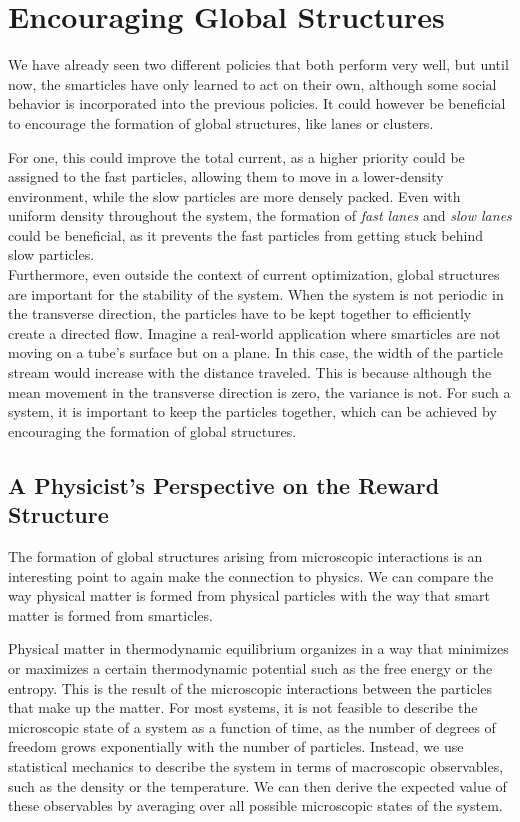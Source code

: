 \section{Encouraging Global Structures}
\label{sec:global_structures}
We have already seen two different policies that both perform very well, but until now, the smarticles have only learned to act on their own, although some social behavior is incorporated into the previous policies. It could however be beneficial to encourage the formation of global structures, like lanes or clusters. 


For one, this could improve the total current, as a higher priority could be assigned to the fast particles, allowing them to move in a lower-density environment, while the slow particles are more densely packed. Even with uniform density throughout the system, the formation of \textit{fast lanes} and \textit{slow lanes} could be beneficial, as it prevents the fast particles from getting stuck behind slow particles.
\\
Furthermore, even outside the context of current optimization, global structures are important for the stability of the system. When the system is not periodic in the transverse direction, the particles have to be kept together to efficiently create a directed flow. Imagine a real-world application where smarticles are not moving on a tube's surface but on a plane. In this case, the width of the particle stream would increase with the distance traveled. This is because although the mean movement in the transverse direction is zero, the variance is not. For such a system, it is important to keep the particles together, which can be achieved by encouraging the formation of global structures.

\subsection{A Physicist's Perspective on the Reward Structure}
\label{sec:physics_reward_structure}
The formation of global structures arising from microscopic interactions is an interesting point to again make the connection to physics. We can compare the way physical matter is formed from physical particles with the way that smart matter is formed from smarticles. 


Physical matter in thermodynamic equilibrium organizes in a way that minimizes or maximizes a certain thermodynamic potential such as the free energy or the entropy. This is the result of the microscopic interactions between the particles that make up the matter. For most systems, it is not feasible to describe the microscopic state of a system as a function of time, as the number of degrees of freedom grows exponentially with the number of particles. Instead, we use statistical mechanics to describe the system in terms of macroscopic observables, such as the density or the temperature. We can then derive the expected value of these observables by averaging over all possible microscopic states of the system.


